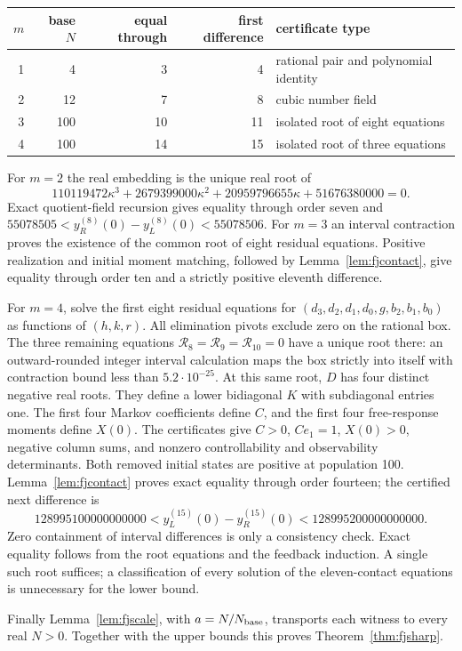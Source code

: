 \documentclass[11pt]{article}
\theoremstyle{remark}\newtheorem{remark}[theorem]{Remark}
\begin{document}
\begin{center}
\begin{tabular}{@{}rrrrl@{}}\toprule
$m$&base $N$&equal through&first difference&certificate type\\\midrule
1&4&3&4&rational pair and polynomial identity\\
2&12&7&8&cubic number field\\
3&100&10&11&isolated root of eight equations\\
4&100&14&15&isolated root of three equations\\\bottomrule
\end{tabular}
\end{center}
For $m=2$ the real embedding is the unique real root of
\[
 110119472\kappa^3+2679399000\kappa^2+20959796655\kappa
   +51676380000=0.
\]
Exact quotient-field recursion gives equality through order seven and
$55078505<y_R^{(8)}(0)-y_L^{(8)}(0)<55078506$.
For $m=3$ an interval contraction proves the existence of the common
root of eight residual equations. Positive realization and initial
moment matching, followed by Lemma~\ref{lem:fjcontact}, give equality
through order ten and a strictly positive eleventh difference.

For $m=4$, solve the first eight residual equations for
$(d_3,d_2,d_1,d_0,g,b_2,b_1,b_0)$ as functions of $(h,k,r)$.
All elimination pivots exclude zero on the rational box.
The three remaining equations $\mathcal R_8=\mathcal R_9=
\mathcal R_{10}=0$ have a unique root there: an outward-rounded
integer interval calculation maps the box strictly into itself with
contraction bound less than $5.2\cdot10^{-25}$.
At this same root, $D$ has four distinct negative real roots. They define
a lower bidiagonal $K$ with subdiagonal entries one. The first four
Markov coefficients define $C$, and the first four free-response moments
define $X(0)$. The certificates give $C>0$, $Ce_1=1$, $X(0)>0$,
negative column sums, and nonzero controllability and observability
determinants. Both removed initial states are positive at population 100.
Lemma~\ref{lem:fjcontact} proves exact equality through order fourteen;
the certified next difference is
\[
 128995100000000000<y_L^{(15)}(0)-y_R^{(15)}(0)
       <128995200000000000.
\]
Zero containment of interval differences is only a consistency check.
Exact equality follows from the root equations and the feedback induction.
A single such root suffices; a classification of every solution of the
eleven-contact equations is unnecessary for the lower bound.

Finally Lemma~\ref{lem:fjscale}, with $a=N/N_{\rm base}$, transports
each witness to every real $N>0$. Together with the upper bounds this
proves Theorem~\ref{thm:fjsharp}.
\end{document}
